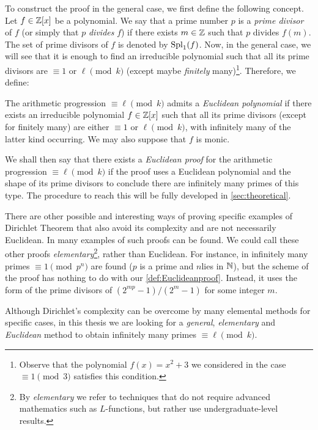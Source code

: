 \documentclass[../main.tex]{subfiles}
\begin{document}
To construct the proof in the general case, we first define the following concept. Let $f\in\mathbb{Z}[x]$ be a polynomial. We say that a prime number $p$ is a \emph{prime divisor} of $f$ (or simply that $p$ \emph{divides} $f$) if there exists $m\in\mathbb{Z}$ such that $p$ divides $f(m)$. The set of prime divisors of $f$ is denoted by $\operatorname{Spl}_1(f)$. Now, in the general case, we will see that it is enough to find an irreducible polynomial such that all its prime divisors are $\equiv 1$ or $\ell \pmod{k}$ (except maybe \emph{finitely} many)\footnote{Observe that the polynomial $f(x)=x^2+3$ we considered in the case $\equiv 1 \pmod{3}$ satisfies this condition.}. Therefore, we define:
\begin{definition}\label{def:Euclideanproof}
	The arithmetic progression $\equiv\ell \pmod{k}$ admits a \emph{Euclidean polynomial} if there exists an irreducible polynomial $f\in\mathbb{Z}[x]$ such that all its prime divisors (except for finitely many) are either $\equiv 1$ or $\ell \pmod{k}$, with infinitely many of the latter kind occurring. We may also suppose that $f$ is monic.
\end{definition}
We shall then say that there exists a \emph{Euclidean proof} for the arithmetic progression $\equiv \ell \pmod{k}$ if the proof uses a Euclidean polynomial and the shape of its prime divisors to conclude there are infinitely many primes of this type. The procedure to reach this will be fully developed in \cref{sec:theoretical}.

There are other possible and interesting ways of proving specific examples of Dirichlet Theorem that also avoid its complexity and are not necessarily Euclidean. In \cite{GueronTessler, XianzuLin, Selberg, Mestrovic} many examples of such proofs can be found. We could call these other proofs \textit{elementary}\footnote{By \emph{elementary} we refer to techniques that do not require advanced mathematics such as $L$-functions, but rather use undergraduate-level results.}, rather than Euclidean. For instance, in \cite{Shanks} infinitely many primes $\equiv 1 \pmod{p^n}$ are found ($p$ is a prime and $n$lies in $\mathbb{N}$), but the scheme of the proof has nothing to do with our \cref{def:Euclideanproof}. Instead, it uses the form of the prime divisors of $(2^{mp}-1)/(2^m-1)$ for some integer $m$.

Although Dirichlet's complexity can be overcome by many elemental methods for specific cases, in this thesis we are looking for a \emph{general}, \emph{elementary} and \emph{Euclidean} method to obtain infinitely many primes $\equiv \ell\pmod{k}$.
\end{document}
